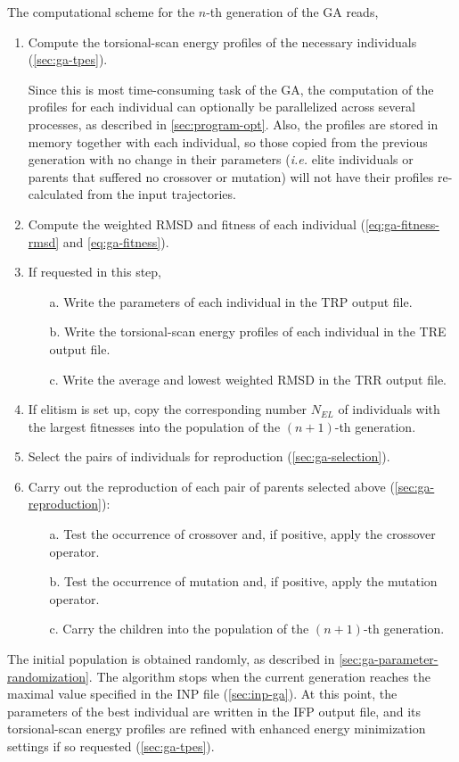 \documentclass[10pt,a4paper,openany]{memoir}
\numberwithin{equation}{section}
\newcommand{\revyan}[1]{{\color{red}{[#1]}}}
\begin{document}
The computational scheme for the $n$-th generation of the GA reads,
\begin{enumerate}
\item Compute the torsional-scan energy profiles of the necessary individuals (\autoref{sec:ga-tpes}).
  \par
  Since this is most time-consuming task of the GA, the computation of
  the profiles for each individual can optionally be parallelized
  across several processes, as described in
  \autoref{sec:program-opt}. Also, the profiles are stored in memory
  together with each individual, so those copied from the previous
  generation with no change in their parameters (\textit{i.e.} elite
  individuals or parents that suffered no crossover or mutation) will
  not have their profiles re-calculated from the input trajectories.

\item Compute the weighted RMSD and fitness of each individual
  (\autoref{eq:ga-fitness-rmsd} and \autoref{eq:ga-fitness}).
\item If requested in this step,
  \begin{enumerate}
  \item[a.]  Write the parameters of each individual in the TRP output file.
  \item [b.] Write the torsional-scan energy profiles of each individual in the TRE output file.
  \item [c.] Write the average and lowest weighted RMSD in the TRR output file.
  \end{enumerate}
\item If elitism is set up, copy the corresponding number $N_{EL}$ of individuals  with the largest fitnesses into the population of the $(n+1)$-th generation.
\item Select the pairs of individuals for reproduction (\autoref{sec:ga-selection}).
\item Carry out the reproduction of each pair of parents selected above (\autoref{sec:ga-reproduction}):
  \begin{enumerate}
  \item[a.] Test the occurrence of crossover and, if positive, apply the crossover operator.
  \item[b.] Test the occurrence of mutation and, if positive, apply the mutation operator.
  \item[c.] Carry the children into the population of the $(n+1)$-th generation.
  \end{enumerate}
\end{enumerate}
The initial population is obtained randomly, as described in \autoref{sec:ga-parameter-randomization}.
The algorithm stops when the current generation reaches the maximal value specified in the INP file (\autoref{sec:inp-ga}).
At this point, the parameters of the best individual are written in the IFP output file, and its torsional-scan energy profiles are refined with enhanced energy minimization settings if so requested (\autoref{sec:ga-tpes}).
\end{document}
